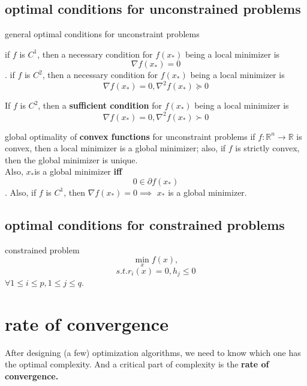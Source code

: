 \documentclass[lang=cn,11pt]{elegantbook}
\begin{document}
\subsection{optimal conditions for unconstrained problems}
\begin{theorem}{general optimal conditions for unconstraint problems}

    if $f $ is $C^1$, then a necessary condition for $f(x_*)$ being a local minimizer is $$\nabla f(x_*) = 0$$.
     if $f $ is $C^2$, then a necessary condition for $f(x_*)$ being a local minimizer is 
     $$
     \nabla f(x_*) = 0, \nabla ^2f(x_*) \succeq 0
     $$

     If $f$ is $C^2$, then a \textbf{sufficient condition} for $f(x_*)$ being a local minimizer is 
     $$
     \nabla f(x_*) = 0, \nabla ^2f(x_*) \succ 0
     $$
     
\end{theorem}


\begin{theorem}{global optimality of \textbf{convex functions} for unconstraint problems}
    if $f: \mathbb{R}^n \rightarrow \mathbb{R}$ is convex, then a local minimizer is a global minimizer; also, if $f$ is strictly convex, then the global minimizer is unique.\\
    Also, $x_*$is a global minimizer \textbf{iff} $$
    0 \in \partial f(x_*)
    $$
. Also, if $f$ is $C^1$, then $\nabla f(x_*) = 0 \implies$ $x_*$ is a global minimizer.
    
\end{theorem}




\subsection{optimal conditions for constrained problems}

\begin{definition}{constrained problem}
    \[
    \min_x f(x) ,
    \]
    \[s.t. r_i(x) =0, h_j  \leq 0\]
    $\forall 1 \leq i \leq p,1\leq j \leq q$.

\end{definition}





\section{rate of convergence}

After designing (a few) optimization algorithms, we need to know which one has the optimal complexity. And a critical part of complexity is the \textbf{rate of convergence.}
\end{document}
